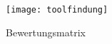 
\begin{figure}[htpb]
    \centering
    \texttt{[image: toolfindung]}
    \caption{Bewertungsmatrix}
    \label{img:toolfindung}
\end{figure}
